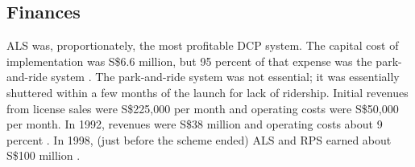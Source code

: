 \subsection{Finances}

ALS was, proportionately, the most profitable DCP system. The capital cost of implementation was S\$6.6 million, but 95 percent of that expense was the park-and-ride system \citep[p. 38]{WatsonHolland1978}. The park-and-ride system was not essential; it was essentially shuttered within a few months of the launch for lack of ridership. Initial revenues from license sales were S\$225,000 per month and operating costs were S\$50,000 per month. In 1992, revenues were S\$38 million and operating costs about 9 percent \citep[[p. 21]{Gomez-Ibanez1994}. In 1998, (just before the scheme ended) ALS and RPS earned about S\$100 million \citep{Goh2002,Chin2009}.